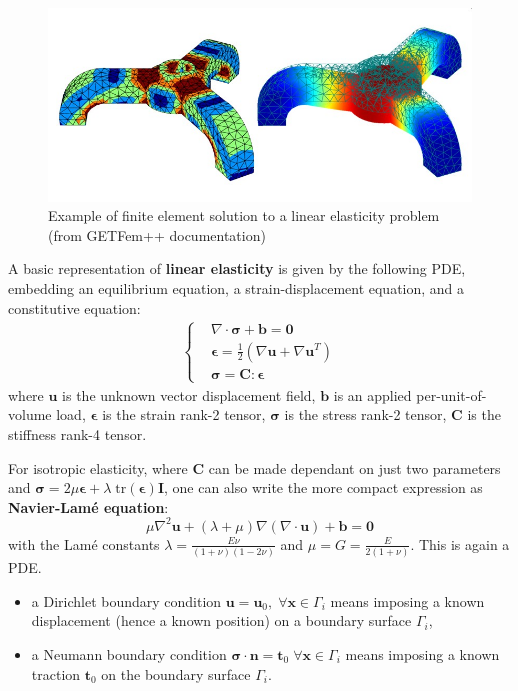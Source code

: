 \documentclass{digitaldynamics}
\def\vect#1{\bm{#1}}
\def\tensor#1{\bm{#1}}
\begin{document}
\begin{figure}
		\centering
			\includegraphics[width=12cm]{pics/es_elasticity.jpg}
		\caption{Example of finite element solution to a linear elasticity problem (from GETFem++ documentation)}
		\label{fig:es_elasticity}
	\end{figure}
	
	
A basic representation of \textbf{linear elasticity} is given by the following PDE, embedding an equilibrium equation, a strain-displacement equation, and a constitutive equation: 
\begin{align}
	\left\{
	\begin{aligned}
		 & \nabla \cdot \tensor{\sigma} + \tensor{b} = \vect{0} \\
		 & \tensor{\epsilon} = \frac{1}{2} \left( \nabla \vect{u} + \nabla \vect{u}^T \right) \\
		 & \tensor{\sigma} = \tensor{C} : \tensor{\epsilon}
	\end{aligned}
	\right.
\end{align}
where 
$\vect{u}$ is the unknown vector displacement field,
$\vect{b}$ is an applied per-unit-of-volume load,
$\tensor{\epsilon}$ is the strain rank-2 tensor,
$\tensor{\sigma}$ is the stress rank-2 tensor,
$\tensor{C}$ is the stiffness rank-4 tensor. %

For isotropic elasticity, where $\tensor{C}$ can be made dependant on just two parameters and 
$\tensor{\sigma}=2\mu \tensor{\epsilon} +\lambda \; \mathrm{tr}(\tensor{\epsilon})\tensor{I}$,
one can also write the more compact expression as \textbf{Navier-Lamé equation}:
\[
\mu \nabla^2 \vect{u} + (\lambda + \mu) \nabla ( \nabla \cdot \vect{u}) + \tensor{b} = \vect{0}
\]
with the Lamé constants 
$\lambda = \frac{E\nu}{(1+\nu)(1-2\nu)}$ and 
$\mu = G = \frac{E}{2(1+\nu)}$.
This is again a PDE. 

\begin{itemize}
		\item a Dirichlet boundary condition $\vect{u}=\vect{u}_0, \; \forall \vect{x}\in\Gamma_i$ means imposing a known displacement (hence a known position) on a boundary surface $\Gamma_i$, 
		\item a Neumann boundary condition $\tensor{\sigma} \cdot \vect{n} = \vect{t}_0 \; \forall \vect{x}\in\Gamma_i$ means imposing a known traction $\vect{t}_0$ on the boundary surface $\Gamma_i$.
	\end{itemize}
\end{document}
